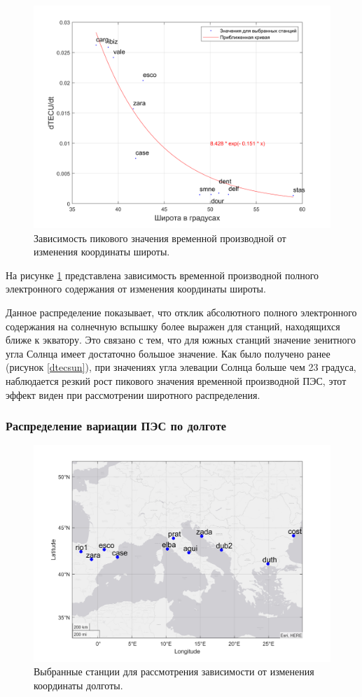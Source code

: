 \documentclass[a4paper]{article}
\begin{document}
\begin{figure}[h!]
\centering
\includegraphics[width = 0.8\linewidth]{pics/clean_pics/dtec_lat.png}
\caption{Зависимость пикового значения временной производной от изменения координаты широты.}
\label{dteclat}
\end{figure}

На рисунке \ref{dteclat} представлена зависимость временной производной полного электронного содержания от изменения координаты широты.

Данное распределение показывает, что отклик абсолютного полного электронного содержания на солнечную вспышку более выражен для станций, находящихся ближе к экватору. Это связано с тем, что для южных станций значение зенитного угла Солнца имеет достаточно большое значение. Как было получено ранее (рисунок \ref{dtecsun}), при значениях угла элевации Солнца больше чем 23 градуса, наблюдается резкий рост пикового значения временной производной ПЭС, этот эффект  виден при рассмотрении широтного распределения.




\subsubsection{Распределение вариации ПЭС по долготе}

\begin{figure}[h!]
\centering
\includegraphics[width = 0.8\linewidth]{pics/clean_pics/lonStations.png}
\caption{Выбранные станции для рассмотрения зависимости от изменения координаты долготы.}
\label{stationslon}
\end{figure}
\end{document}
